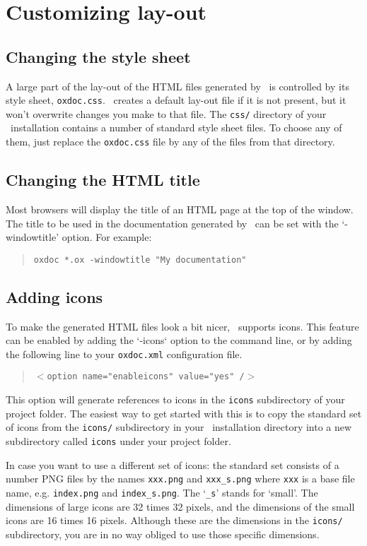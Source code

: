 \chapter{Customizing lay-out}

\section{Changing the style sheet}
A large part of the lay-out of the HTML files generated by \oxdoc~is controlled by its
style sheet, {\tt oxdoc.css}. \oxdoc~creates a default
lay-out file if it is not present, but it won't overwrite changes you make
to that file. The {\tt css/} directory of your \oxdoc~installation contains a number of 
standard style sheet files. To choose any of them, just replace the {\tt oxdoc.css} file
by any of the files from that directory. 

\section{Changing the HTML title}
Most browsers will display the title of an HTML page at the top of the window. The title to be used
in the documentation generated by \oxdoc~can be set with the `-windowtitle' option. For example:
\begin{quote}
\tt oxdoc *.ox -windowtitle "My documentation"
\end{quote}

\section{Adding icons}\label{sec:icons}
To make the generated HTML files look a bit nicer, \oxdoc~supports icons. This feature can
be enabled by adding the `-icons` option to the command line, or by adding the following line
to your {\tt oxdoc.xml} configuration file.
\begin{quote}
\tt $<$option name="enableicons" value="yes" /$>$
\end{quote}
This option will generate references to icons in the {\tt icons} subdirectory of your
project folder. The easiest way to get started with this is to copy the standard set of icons 
from the {\tt icons/} subdirectory in your \oxdoc~installation
directory into a new subdirectory called {\tt icons} under your project folder. 

In case you want to use a different set of icons: 
the standard set consists of a number PNG files by the names {\tt xxx.png} and {\tt xxx\_s.png} where
{\tt xxx} is a base file name, e.g. {\tt index.png} and {\tt index\_s.png}. The `{\tt \_s}' stands for
`small'. The dimensions of large icons are 32 times 32 pixels, and the dimensions of the small icons
are 16 times 16 pixels. Although these are the dimensions in the {\tt icons/} subdirectory,
you are in no way obliged to use those specific dimensions. 

